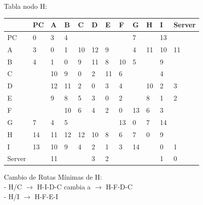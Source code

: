 \documentclass[a4paper]{article}
\begin{document}
\begin{table}[h]
Tabla nodo H:\\
\begin{tabular}{|l|l|l|l|l|l|l|l|l|l|l|l|}
\hline
       & PC & A  & B  & C  & D  & E  & F  & G  & H  & I  & Server \\ \hline
PC     & 0  & 3  & 4  &    &    &    &    & 7  &    & 13 &        \\ \hline
A      & 3  & 0  & 1  & 10 & 12 & 9  &    & 4  & 11 & 10 & 11     \\ \hline
B      & 4  & 1  & 0  & 9  & 11 & 8  & 10 & 5  &    & 9  &        \\ \hline
C      &    & 10 & 9  & 0  & 2  & 11 & 6  &    &    & 4  &        \\ \hline
D      &    & 12 & 11 & 2  & 0  & 3  & 4  &    & 10 & 2  & 3      \\ \hline
E      &    & 9  & 8  & 5  & 3  & 0  & 2  &    & 8  & 1  & 2      \\ \hline
F      &    &    & 10 & 6  & 4  & 2  & 0  & 13 & 6  & 3  &        \\ \hline
G      & 7  & 4  & 5  &    &    &    & 13 & 0  & 7  & 14 &        \\ \hline
H      & 14 & 11 & 12 & 12 & 10 & 8  & 6  & 7  & 0  & 9  &        \\ \hline
I      & 13 & 10 & 9  & 4  & 2  & 1  & 3  & 14 &    & 0  & 1      \\ \hline
Server &    & 11 &    &    & 3  & 2  &    &    &    & 1  & 0      \\ \hline
\end{tabular}

Cambio de Rutas Mínimas de H:\\
-	H/C  $\rightarrow$  H-I-D-C  cambia a  $\rightarrow$  H-F-D-C\\
-	H/I  $\rightarrow$  H-F-E-I\\

\end{table}
\clearpage
\end{document}
